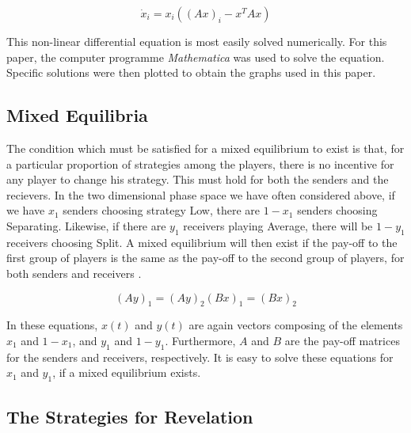 \documentclass[a4paper,10pt]{article}
\numberwithin{equation}{section}
\begin{document}
\begin{equation}
\label{eq:Replicator}
\dot{x}_i=x_i({(Ax)}_i-x^T Ax)
\end{equation}

This non-linear differential equation is most easily solved numerically. For this paper, the computer programme \textit{Mathematica} was used to solve the equation. Specific solutions were then plotted to obtain the graphs used in this paper.

\subsection{Mixed Equilibria}
\label{sec:Mixed Equilibria}

The condition which must be satisfied for a mixed equilibrium to exist is that, for a particular proportion of strategies among the players, there is no incentive for any player to change his strategy. This must hold for both the senders and the recievers. In the two dimensional phase space we have often considered above, if we have $x_1$ senders choosing strategy Low, there are $1-x_1$ senders choosing Separating. Likewise, if there are $y_1$ receivers playing Average, there will be $1-y_1$ receivers choosing Split. A mixed equilibrium will then exist if the pay-off to the first group of players is the same as the pay-off to the second group of players, for both senders and receivers \cite{Gintis2009}.

\begin{subequations}
\label{eq:Solvexandy}
\begin{equation}
{(Ay)}_1={(Ay)}_2
\end{equation}
\begin{equation}
{(Bx)}_1={(Bx)}_2
\end{equation}
\end{subequations}

In these equations, $x(t)$ and $y(t)$ are again vectors composing of the elements $x_1$ and $1-x_1$, and $y_1$ and $1-y_1$. Furthermore, $A$ and $B$ are the pay-off matrices for the senders and receivers, respectively. It is easy to solve these equations for $x_1$ and $y_1$, if a mixed equilibrium exists.

\subsection{The Strategies for Revelation}
\label{sec:The Strategies for Revelation}
\end{document}
